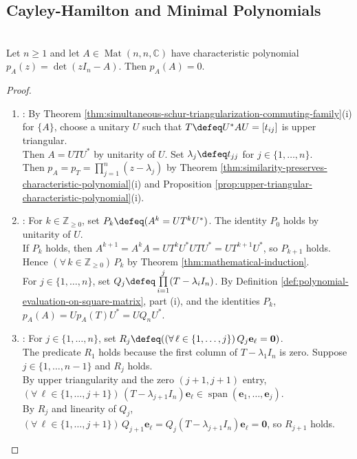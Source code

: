 \subsection{Cayley-Hamilton and Minimal Polynomials}

\begin{theorem} \label{thm:cayley-hamilton-matrix} \\
Let $n\geq1$ and let $A\in\operatorname{Mat}(n,n,\mathbb{C})$ have characteristic polynomial $p_A(z)=\det(zI_n-A)$. Then $p_A(A)=0$.
\begin{proof}
\begin{enumerate}[label=(\roman*)]
\setlength{\itemsep}{0pt}
\item {}: By Theorem \ref{thm:simultaneous-schur-triangularization-commuting-family}(i) for $\{A\}$, choose a unitary $U$ such that $T\defeq U^*AU=[t_{ij}]$ is upper triangular.\\
Then $A=UTU^*$ by unitarity of $U$. Set $\lambda_j\defeq t_{jj}$ for $j\in\{1,\ldots,n\}$.\\
Then $p_A=p_T=\prod\limits_{j=1}^{n}(z-\lambda_j)$ by Theorem \ref{thm:similarity-preserves-characteristic-polynomial}(i) and Proposition \ref{prop:upper-triangular-characteristic-polynomial}(i).
\item {}: For $k\in\mathbb{Z}_{\geq0}$, set $P_k\defeq(A^k=UT^kU^*)$. The identity $P_0$ holds by unitarity of $U$.\\
If $P_k$ holds, then $A^{k+1}=A^kA=UT^kU^*UTU^*=UT^{k+1}U^*$, so $P_{k+1}$ holds. Hence $(\forall\,k\in\mathbb{Z}_{\geq0})\,P_k$ by Theorem \ref{thm:mathematical-induction}.\\
For $j\in\{1,\ldots,n\}$, set $Q_j\defeq\prod\limits_{i=1}^{j}(T-\lambda_iI_n)$. By Definition \ref{def:polynomial-evaluation-on-square-matrix}, part (i), and the identities $P_k$, $p_A(A)=Up_A(T)U^*=UQ_nU^*$.
\item {}: For $j\in\{1,\ldots,n\}$, set $R_j\defeq((\forall\,\ell\in\{1,\ldots,j\})\,Q_j\mathbf{e}_{\ell}=\mathbf{0})$.\\
The predicate $R_1$ holds because the first column of $T-\lambda_1I_n$ is zero. Suppose $j\in\{1,\ldots,n-1\}$ and $R_j$ holds.\\
By upper triangularity and the zero $(j+1,j+1)$ entry, $(\forall\,\ell\in\{1,\ldots,j+1\})\,(T-\lambda_{j+1}I_n)\mathbf{e}_{\ell}\in\operatorname{span}(\mathbf{e}_1,\ldots,\mathbf{e}_j)$.\\
By $R_j$ and linearity of $Q_j$, $(\forall\,\ell\in\{1,\ldots,j+1\})\,Q_{j+1}\mathbf{e}_{\ell}=Q_j(T-\lambda_{j+1}I_n)\mathbf{e}_{\ell}=\mathbf{0}$, so $R_{j+1}$ holds.\\

\end{enumerate}
\end{proof}
\end{theorem}
